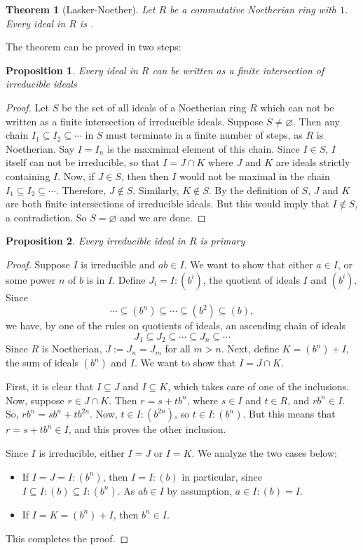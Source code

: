 \documentclass[12pt]{article}
\newtheorem{prop}{Proposition}
\newtheorem{thm}{Theorem}
\newcommand{\quo}[2]{#1 \!:\! #2}
\begin{document}
\begin{thm}[Lasker-Noether]  Let $R$ be a commutative Noetherian ring with $1$.  Every ideal in $R$ is . \end{thm}

The theorem can be proved in two steps:

\begin{prop} Every ideal in $R$ can be written as a finite intersection of irreducible ideals \end{prop}
\begin{proof}
Let $S$ be the set of all ideals of a Noetherian ring $R$ which can not be written as a finite intersection of irreducible ideals.  Suppose $S\ne \varnothing$.  Then any chain $I_1\subseteq I_2 \subseteq \cdots $ in $S$ must terminate in a finite number of steps, as $R$ is Noetherian.  Say $I=I_n$ is the maxmimal element of this chain.  Since $I\in S$, $I$ itself can not be irreducible, so that $I=J\cap K$ where $J$ and $K$ are ideals strictly containing $I$.  Now, if $J\in S$, then then $I$ would not be maximal in the chain $I_1\subseteq I_2 \subseteq \cdots$.  Therefore, $J\notin S$.  Similarly, $K\notin S$.  By the definition of $S$, $J$ and $K$ are both finite intersections of irreducible ideals.  But this would imply that $I\notin S$, a contradiction.  So $S=\varnothing$ and we are done.
\end{proof}

\begin{prop} Every irreducible ideal in $R$ is primary \end{prop}
\begin{proof}
Suppose $I$ is irreducible and $ab\in I$.  We want to show that either $a\in I$, or some power $n$ of $b$ is in $I$.  Define $J_i=\quo{I}{(b^i)}$, the quotient of ideals $I$ and $(b^i)$.  Since $$\cdots \subseteq (b^n)\subseteq \cdots \subseteq (b^2)\subseteq (b),$$ we have, by one of the rules on quotients of ideals, an ascending chain of ideals $$J_1\subseteq J_2 \subseteq \cdots \subseteq J_n \subseteq \cdots $$ Since $R$ is Noetherian, $J:=J_n=J_m$ for all $m>n$.  Next, define $K=(b^n)+I$, the sum of ideals $(b^n)$ and $I$.  We want to show that $I=J\cap K$.

First, it is clear that $I\subseteq J$ and $I\subseteq K$, which takes care of one of the inclusions.  Now, suppose $r\in J\cap K$.  Then $r=s+tb^n$, where $s\in I$ and $t\in R$, and $rb^n\in I$.  So, $rb^n=sb^n+tb^{2n}$.  Now, $t\in \quo{I}{(b^{2n})}$, so $t\in \quo{I}{(b^n)}$.  But this means that $r=s+tb^n\in I$, and this proves the other inclusion.

Since $I$ is irreducible, either $I=J$ or $I=K$.  We analyze the two cases below:
\begin{itemize}
\item
If $I=J=\quo{I}{(b^n)}$, then $I=\quo{I}{(b)}$ in particular, since $I\subseteq \quo{I}{(b)} \subseteq \quo{I}{(b^n)}$.  As $ab\in I$ by assumption, $a\in \quo{I}{(b)}= I$.  
\item
If $I=K=(b^n)+I$, then $b^n\in I$.
\end{itemize}
This completes the proof.
\end{proof}
\end{document}
